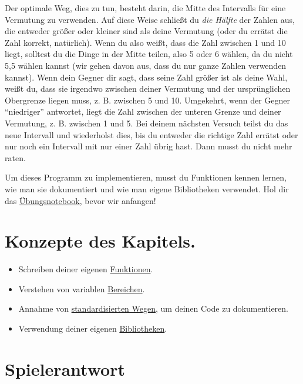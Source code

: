 \documentclass[
]{book}
\providecommand{\tightlist}{%
  \setlength{\itemsep}{0pt}\setlength{\parskip}{0pt}}
\begin{document}
Der optimale Weg, dies zu tun, besteht darin, die Mitte des Intervalls für eine Vermutung zu verwenden. Auf diese Weise schließt du \emph{die Hälfte} der Zahlen aus, die entweder größer oder kleiner sind als deine Vermutung (oder du errätst die Zahl korrekt, natürlich). Wenn du also weißt, dass die Zahl zwischen 1 und 10 liegt, solltest du die Dinge in der Mitte teilen, also 5 oder 6 wählen, da du nicht 5,5 wählen kannst (wir gehen davon aus, dass du nur ganze Zahlen verwenden kannst). Wenn dein Gegner dir sagt, dass seine Zahl größer ist als deine Wahl, weißt du, dass sie irgendwo zwischen deiner Vermutung und der ursprünglichen Obergrenze liegen muss, z. B. zwischen 5 und 10. Umgekehrt, wenn der Gegner ``niedriger'' antwortet, liegt die Zahl zwischen der unteren Grenze und deiner Vermutung, z. B. zwischen 1 und 5. Bei deinem nächsten Versuch teilst du das neue Intervall und wiederholst dies, bis du entweder die richtige Zahl errätst oder nur noch ein Intervall mit nur einer Zahl übrig hast. Dann musst du nicht mehr raten.

Um dieses Programm zu implementieren, musst du Funktionen kennen lernen, wie man sie dokumentiert und wie man eigene Bibliotheken verwendet. Hol dir das \href{notebooks/Guess\%20the\%20number\%20-\%20AI.ipynb}{Übungsnotebook}, bevor wir anfangen!

\hypertarget{konzepte-des-kapitels.}{%
\section{Konzepte des Kapitels.}\label{konzepte-des-kapitels.}}

\begin{itemize}
\tightlist
\item
  Schreiben deiner eigenen \protect\hyperlink{function}{Funktionen}.
\item
  Verstehen von variablen \protect\hyperlink{scopes-for-immutable-values}{Bereichen}.
\item
  Annahme von \protect\hyperlink{numpy-docstring}{standardisierten Wegen}, um deinen Code zu dokumentieren.
\item
  Verwendung deiner eigenen \protect\hyperlink{using-you-own-libraries}{Bibliotheken}.
\end{itemize}

\hypertarget{guess-the-number-players-response}{%
\section{Spielerantwort}\label{guess-the-number-players-response}}
\end{document}
